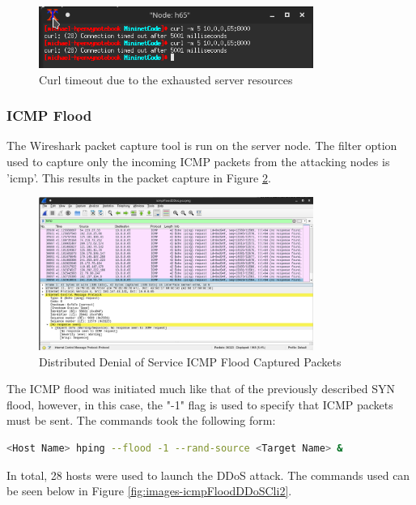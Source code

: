 \begin{figure}[H]
	\centering
	\includegraphics[width=0.8\textwidth]{images/synFloodDDoSCurl}
	\caption{Curl timeout due to the exhausted server resources}
	\label{fig:images-synFloodDDoSCurl}
\end{figure}

\subsubsection{ICMP Flood}

The Wireshark packet capture tool is run on the server node. The filter option
used to capture only the incoming ICMP packets from the attacking nodes is
'icmp'. This results in the packet capture in Figure
\ref{fig:images-icmpFloodDDoSWs}.

\begin{figure}[H]
	\centering
	\includegraphics[width=0.8\textwidth]{images/icmpFloodDDoSWs}
	\caption{Distributed Denial of Service ICMP Flood Captured Packets}
	\label{fig:images-icmpFloodDDoSWs}
\end{figure}

The ICMP flood was initiated much like that of the previously described SYN
flood, however, in this case, the "-1" flag is used to specify that ICMP packets
must be sent. The commands took the following form:

\begin{lstlisting}[language=bash, caption=Mininet CLI commands for ICMP DDoS Attack]
	<Host Name> hping --flood -1 --rand-source <Target Name> &
\end{lstlisting}

In total, 28 hosts were used to launch the DDoS attack. The commands used can be
seen below in Figure \ref{fig:images-icmpFloodDDoSCli2}.


